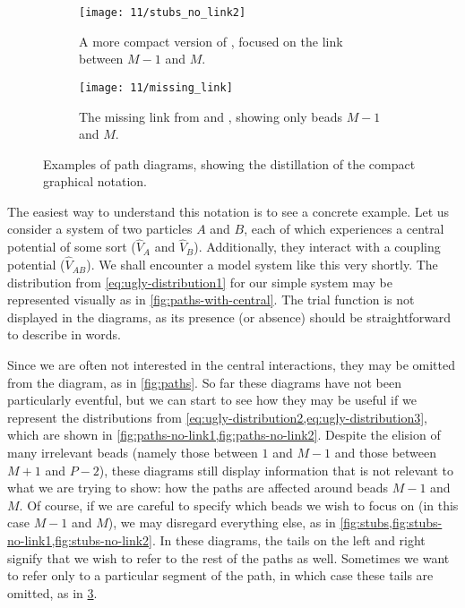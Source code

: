 \begin{figure}
	\mbox{}
	\hfill
	\begin{subfigure}[b]{0.45\textwidth}
		\centering
		\texttt{[image: 11/stubs\_no\_link2]}
		\caption{
			A more compact version of , focused on the link between $M-1$ and $M$.
		}
		\label{fig:stubs-no-link2}
	\end{subfigure}
	\hfill
	\begin{subfigure}[b]{0.45\textwidth}
		\centering
		\texttt{[image: 11/missing\_link]}
		\caption{
			The missing link from  and , showing only beads $M-1$ and $M$.
		}
		\label{fig:missing-link}
	\end{subfigure}
	\hfill
	\mbox{}
	\caption[
		Examples of path diagrams
	]{
		Examples of path diagrams, showing the distillation of the compact graphical notation.
	}
\end{figure}

The easiest way to understand this notation is to see a concrete example.
Let us consider a system of two particles $A$ and $B$, each of which experiences a central potential of some sort ($\hat{V}_A$ and $\hat{V}_B$).
Additionally, they interact with a coupling potential ($\hat{V}_{AB}$).
We shall encounter a model system like this very shortly.
The distribution from \cref{eq:ugly-distribution1} for our simple system may be represented visually as in \cref{fig:paths-with-central}.
The trial function is not displayed in the diagrams, as its presence (or absence) should be straightforward to describe in words.

Since we are often not interested in the central interactions, they may be omitted from the diagram, as in \cref{fig:paths}.
So far these diagrams have not been particularly eventful, but we can start to see how they may be useful if we represent the distributions from \cref{eq:ugly-distribution2,eq:ugly-distribution3}, which are shown in \cref{fig:paths-no-link1,fig:paths-no-link2}.
Despite the elision of many irrelevant beads (namely those between $1$ and $M-1$ and those between $M+1$ and $P-2$), these diagrams still display information that is not relevant to what we are trying to show: how the paths are affected around beads $M-1$ and $M$.
Of course, if we are careful to specify which beads we wish to focus on (in this case $M-1$ and $M$), we may disregard everything else, as in \cref{fig:stubs,fig:stubs-no-link1,fig:stubs-no-link2}.
In these diagrams, the tails on the left and right signify that we wish to refer to the rest of the paths as well.
Sometimes we want to refer only to a particular segment of the path, in which case these tails are omitted, as in \cref{fig:missing-link}.

